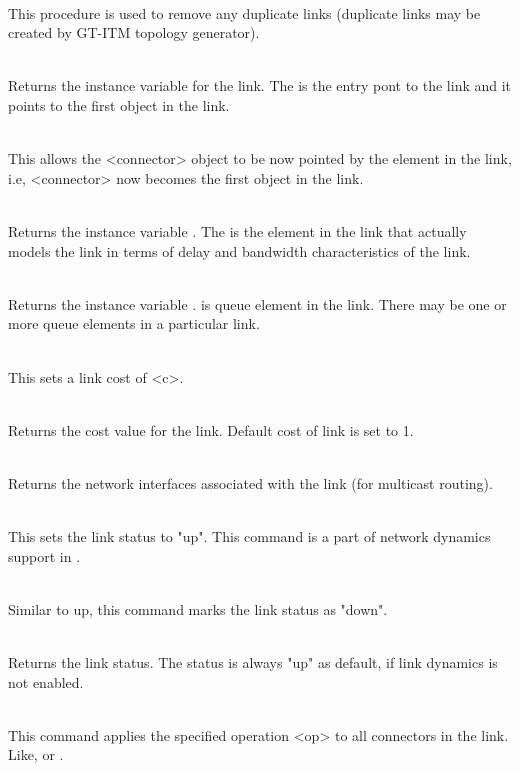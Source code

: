 \begin{flushleft}
\\
This procedure is used to remove any duplicate links (duplicate links may be
created by GT-ITM topology generator).


\\
Returns the instance variable  for the link. The  is
the entry pont to the link and it points to the first object in the link.


\\
This allows the <connector> object to be now pointed by the 
element in the link, i.e, <connector> now becomes the first object in the
link.


\\
Returns the instance variable . The  is the element
in the link that actually models the link in terms of delay and bandwidth
characteristics of the link.


\\
Returns the instance variable .  is queue element
in the link. There may be one or more queue elements in a particular link.


\\
This sets a link cost of <c>.


\\
Returns the cost value for the link. Default cost of link is set to 1.


\\
Returns the network interfaces associated with the link (for multicast routing).


\\
This sets the link status to "up". This command is a part of network
dynamics support in \ns.


\\
Similar to up, this command marks the link status as "down".


\\
Returns the link status. The status is always "up" as default, if link
dynamics is not enabled.


\\ 
This command applies the specified operation <op> to all connectors in the
link.  Like,  or
. 



\end{flushleft}
